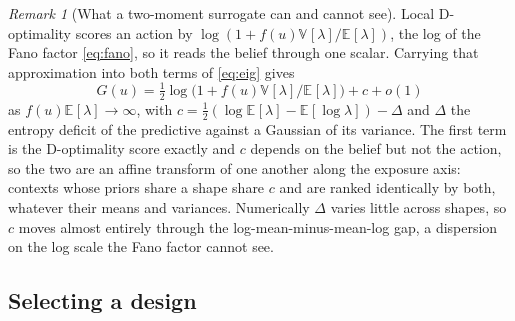\documentclass[twoside]{article}
\providecommand{\Ex}[2]{\mathbb{E}_{#1}\!\left[#2\right]}
\providecommand{\Var}[2]{\mathbb{V}_{#1}\!\left[#2\right]}
\theoremstyle{plain}
\theoremstyle{definition}
\theoremstyle{remark}
\newtheorem{remark}{Remark}
\begin{document}

\begin{remark}[What a two-moment surrogate can and cannot see]
    \label{rem:dopt}
    Local D-optimality scores an action by $\log(1 + f(u) \Var{}{\lambda} / \Ex{}{\lambda})$, the log of the Fano factor \eqref{eq:fano}, so it reads the belief through one scalar.
    Carrying that approximation into both terms of \eqref{eq:eig} gives
    \begin{equation}
        G(u) = \tfrac{1}{2} \log\big( 1 + f(u) \Var{}{\lambda} / \Ex{}{\lambda} \big) + c + o(1)
        \label{eq:dopt_limit}
    \end{equation}
    as $f(u) \Ex{}{\lambda} \to \infty$, with $c = \tfrac{1}{2}( \log \Ex{}{\lambda} - \Ex{}{\log \lambda} ) - \Delta$ and $\Delta$ the entropy deficit of the predictive against a Gaussian of its variance.
    The first term is the D-optimality score exactly and $c$ depends on the belief but not the action, so the two are an affine transform of one another along the exposure axis: contexts whose priors share a shape share $c$ and are ranked identically by both, whatever their means and variances.
    Numerically $\Delta$ varies little across shapes, so $c$ moves almost entirely through the log-mean-minus-mean-log gap, a dispersion on the log scale the Fano factor cannot see.
\end{remark}

\subsection{Selecting a design}
\label{sec:inference_policy}
\end{document}
